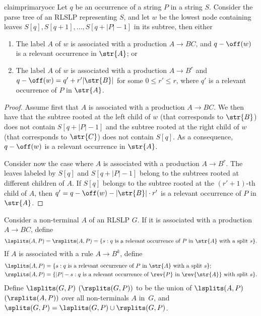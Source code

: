 \begin{restatable}{claim}{primaryocc}
\label{claim:primary_occurrence}
Let $q$ be an occurrence of a string $P$ in a string $S$. Consider the parse tree of an RLSLP representing $S$, and let $w$ be the lowest node containing leaves $S[q], S[q+1], \dots, S[q+|P|-1]$ in its subtree, then either
\begin{enumerate}
\item The label $A$ of $w$ is associated with a production $A \rightarrow BC$, and $q-\off(w)$ is a relevant occurrence in $\str{A}$; or
\item The label $A$ of $w$ is associated with a production $A \rightarrow B^r$ and $q-\off(w)=q'+r' |\str{B}|$ for some $0 \le r' \le r$, where $q'$ is a relevant occurrence of $P$ in $\str{A}$.
\end{enumerate}
\end{restatable}
\begin{proof}
Assume first that $A$ is associated with a production $A \rightarrow BC$. We then have that the subtree rooted at the left child of $w$ (that corresponds to $\str{B}$) does not contain $S[q+|P|-1]$ and the subtree rooted at the right child of $w$ (that corresponds to $\str{C}$) does not contain $S[q]$. As a consequence, $q-\off(w)$ is a relevant occurrence in $\str{A}$. 

Consider now the case where $A$ is associated with a production $A \rightarrow B^r$. The leaves labeled by $S[q]$ and $S[q+|P|-1]$ belong to the subtrees rooted at different children of $A$. If $S[q]$ belongs to the subtree rooted at the $(r'+1)$-th child of $A$, then $q'=q-\off(w)-|\str{B}| \cdot r'$ is a relevant occurrence of $P$ in $\str{A}$. 
\end{proof}

\begin{definition}[Splits]
Consider a non-terminal $A$ of an RLSLP $G$. If it is associated with a production $A \rightarrow BC$, define 
$$\lsplits(A,P) = \rsplits(A,P) = \{s : q \text{ is a relevant occurrence of } P \text{ in } \str{A} \text{ with a split } s\}.$$ 
If $A$ is associated with a rule $A \rightarrow B^k$, define 
\begin{align*}
\lsplits(A,P) &=  \{s : q \text{ is a relevant occurrence of } P \text{ in } \str{A} \text{ with a split } s\};\\
\rsplits(A,P) &=  \{|P|-s : q \text{ is a relevant occurrence of } \rev{P} \text{ in } \rev{\str{A}} \text{ with split } s\}.
\end{align*}
Define $\lsplits(G,P)$ $(\rsplits(G,P))$ to be the union of $\lsplits(A,P)$ $(\rsplits(A,P))$ over all non-terminals $A$ in~$G$, and $\splits(G,P) = \lsplits(G,P) \cup \rsplits(G,P)$. 
\end{definition}

